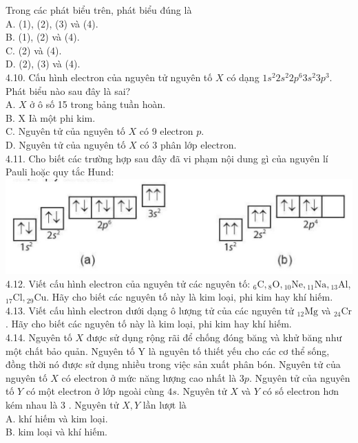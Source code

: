 \documentclass[10pt]{article}
\begin{document}
Trong các phát biểu trên, phát biểu đúng là\\
A. (1), (2), (3) và (4).\\
B. (1), (2) và (4).\\
C. (2) và (4).\\
D. (2), (3) và (4).\\
4.10. Cấu hình electron của nguyên tử nguyên tố $X$ có dạng $1 s^{2} 2 s^{2} 2 p^{6} 3 s^{2} 3 p^{3}$. Phát biểu nào sau đây là sai?\\
A. $X$ ở ô số 15 trong bảng tuần hoàn.\\
B. X Ià một phi kim.\\
C. Nguyên tử của nguyên tố $X$ có 9 electron $p$.\\
D. Nguyên tử của nguyên tố $X$ có 3 phân lớp electron.\\
4.11. Cho biết các trường hợp sau đây đã vi phạm nội dung gì của nguyên lí Pauli hoặc quy tắc Hund:\\
\includegraphics[max width=\textwidth, center]{2025_10_23_883c4b146e2332109fcdg-10}\\
4.12. Viết cấu hình electron của nguyên tử các nguyên tố: ${ }_{6} \mathrm{C},{ }_{8} \mathrm{O},{ }_{10} \mathrm{Ne},{ }_{11} \mathrm{Na},{ }_{13} \mathrm{Al}$, ${ }_{17} \mathrm{Cl},{ }_{29} \mathrm{Cu}$. Hãy cho biết các nguyên tố này là kim loại, phi kim hay khí hiếm.\\
4.13. Viết cấu hình electron dưới dạng ô lượng tử của các nguyên tử ${ }_{12} \mathrm{Mg}$ và ${ }_{24} \mathrm{Cr}$. Hãy cho biết các nguyên tố này là kim loại, phi kim hay khí hiếm.\\
4.14. Nguyên tố $X$ được sử dụng rộng rãi để chống đóng băng và khử băng như một chất bảo quản. Nguyên tố Y là nguyên tố thiết yếu cho các cơ thể sống, đồng thời nó được sử dụng nhiều trong việc sản xuất phân bón. Nguyên tử của nguyên tố $X$ có electron ở mức năng lượng cao nhất là $3 p$. Nguyên tử của nguyên tố $Y$ có một electron ở lớp ngoài cùng $4 s$. Nguyên tử $X$ và $Y$ có số electron hơn kém nhau là 3 . Nguyên tử $X, Y$ lần lượt là\\
A. khí hiếm và kim loại.\\
B. kim loại và khí hiếm.\\
\end{document}
